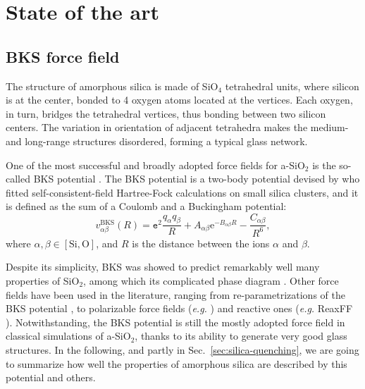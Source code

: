 \section{State of the art}  \label{sec:silica-state-of-the-art}

\subsection{BKS force field}  \label{sec:silica-force-field}
The structure of amorphous silica is made of SiO$_4$ tetrahedral units, where silicon is at the center, bonded to 4 oxygen atoms located at the vertices. Each oxygen, in turn, bridges the tetrahedral vertices, thus bonding between two silicon centers. The variation in orientation of adjacent tetrahedra makes the medium- and long-range structures disordered, forming a typical glass network.

One of the most successful and broadly adopted force fields for a-SiO$_2$ is the so-called BKS potential \cite{Silica-BKS-1990}. 
The BKS potential is a two-body potential devised by \citeauthor{Silica-BKS-1990} who fitted self-consistent-field Hartree-Fock calculations on small silica clusters, and it is defined as the sum of a Coulomb and a Buckingham potential:
\begin{equation}
    v_{\alpha\beta}^{\mathrm{BKS}}(R) = \mathtt{e}^2 \frac{q_\alpha q_\beta}{R} + A_{\alpha\beta}\mathrm{e}^{-B_{\alpha\beta}R} - \frac{C_{\alpha\beta}}{R^6}, \label{eq:BKS}
\end{equation}
where $\alpha,\beta \in [\text{Si},\text{O}]$, and $R$ is the distance between the ions $\alpha$ and $\beta$. 

Despite its simplicity, BKS was showed to predict remarkably well many properties of SiO$_2$, among which its complicated phase diagram \cite{Saika2004}. 
Other force fields have been used in the literature, ranging from re-parametrizations of the BKS potential \cite{Carre2008}, to polarizable force fields (\emph{e.g.} \textcite{Tangney2002}) and reactive ones (\emph{e.g.} ReaxFF \cite{Yuan2001}). 
Notwithstanding, the BKS potential is still the mostly adopted force field in classical simulations of a-SiO$_2$, thanks to its ability to generate very good glass structures. 
In the following, and partly in Sec.~\ref{sec:silica-quenching}, we are going to summarize how well the properties of amorphous silica are described by this potential and others.


